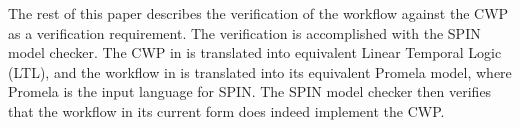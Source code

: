 The rest of this paper describes the verification of the workflow against the CWP as a verification requirement. The verification is accomplished with the SPIN model checker. The CWP in  is translated into equivalent Linear Temporal Logic (LTL), and the workflow in  is translated into its equivalent Promela model, where Promela is the input language for SPIN. The SPIN model checker then verifies that the workflow in its current form does indeed implement the CWP.
